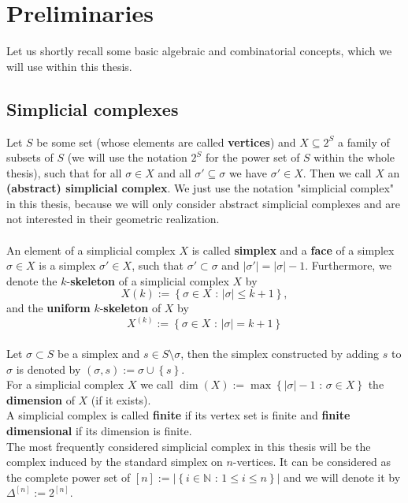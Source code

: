 
\manualmark
{}

\chapter*{Preliminaries}

\label{Preliminaries}

Let us shortly recall some basic algebraic and combinatorial concepts, which we will use within this thesis.

\section*{Simplicial complexes}

Let \(S\) be some set (whose elements are called \textbf{vertices}) and \(X\subseteq 2^S\) a family of subsets of \(S\) (we will use the notation \(2^S\) for the power set of \(S\) within the whole thesis), such that for all \(\sigma\in X\) and all \(\sigma'\subseteq\sigma\) we have \(\sigma'\in X\). Then we call \(X\) an \textbf{(abstract) simplicial complex}. We just use the notation "simplicial complex" in this thesis, because we will only consider abstract simplicial complexes and are not interested in their geometric realization.\\
\\
An element of a simplicial complex \(X\) is called \textbf{simplex} and a \textbf{face} of a simplex \(\sigma\in X\) is a simplex \(\sigma'\in X\), such that \(\sigma'\subset\sigma\) and \(\left|\sigma'\right|=\left|\sigma\right|-1\). Furthermore, we denote the \(k\)-\textbf{skeleton} of a simplicial complex \(X\) by
\[
X(k):=\left\{\sigma\in X\text{ : }\left|\sigma\right|\leq k+1\right\},
\]
and the \textbf{uniform} \(k\)-\textbf{skeleton} of \(X\) by
\[
X^{(k)}:=\left\{\sigma\in X\text{ : }\left|\sigma\right|=k+1\right\}
\]
\\
Let \(\sigma\subset S\) be a simplex and \(s\in S\setminus\sigma\), then the simplex constructed by adding \(s\) to \(\sigma\) is denoted by \((\sigma,s):=\sigma\cup\left\{s\right\}\).\\
For a simplicial complex \(X\) we call \(\dim(X):=\max\left\{\left|\sigma\right|-1\text{ : }\sigma\in X\right\}\) the \textbf{dimension} of \(X\) (if it exists).
\\
A simplicial complex is called \textbf{finite} if its vertex set is finite and \textbf{finite dimensional} if its dimension is finite.\\
The most frequently considered simplicial complex in this thesis will be the complex induced by the standard simplex on \(n\)-vertices. It can be considered as the complete power set of \([n]:=\left|\left\{i\in\mathbb{N}\text{ : }1\leq i\leq n\right\}\right|\) and we will denote it by \(\Delta^{[n]}:=2^{[n]}\).

